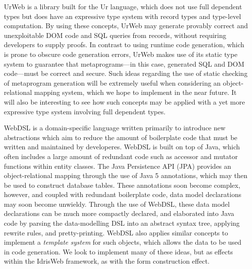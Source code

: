 Ur\/Web \cite{urweb} is a library built for the Ur language, which does not use
full dependent types but does have an expressive type system with 
record types and type-level computation.  By using these concepts,
Ur\/Web may generate provably correct and unexploitable DOM code and SQL
queries from records, without requiring developers to supply proofs.  In
contrast to using runtime code generation, which is prone to obscure code
generation errors, Ur\/Web makes use of its static type system to guarantee
that metaprograms---in this case, generated SQL and DOM code---must be correct
and secure.  Such ideas regarding the use of static checking of metaprogram
generation will be extremely useful when considering an object-relational
mapping system, which we hope to implement in the near future. It will also be
interesting to see how such concepts may be applied with a yet more expressive
type system involving full dependent types.


WebDSL \cite{webdsl} is a domain-specific language written primarily to
introduce new abstractions which aim to reduce the amount of boilerplate code
that must be written and maintained by developeres. WebDSL is built on top of
Java, which often includes a large amount of redundant code such as accessor
and mutator functions within entity classes. The Java Persistence API (JPA)
\cite{jpa} provides an object-relational mapping through the use of Java 5
annotations, which may then be used to construct database tables. These
annotations soon become complex, however, and coupled with redundant
boilerplate code, data model declarations may soon become unwieldy. Through the
use of WebDSL, these data model declarations can be much more compactly
declared, and elaborated into Java code by parsing the data-modelling DSL into
an abstract syntax tree, applying rewrite rules, and pretty-printing. WebDSL
also applies similar concepts to implement a \textit{template system} for such
objects, which allows the data to be used in code generation. We look to
implement many of these ideas, but as effects within the IdrisWeb
framework, as with the form construction effect.

